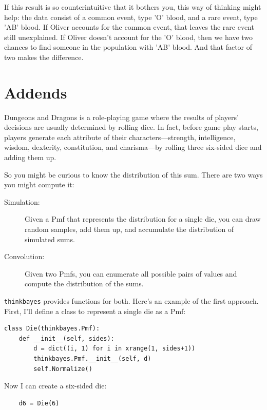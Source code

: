 \documentclass[12pt]{book}
\begin{document}
If this result is so counterintuitive that it bothers you,
this way of thinking might help: the data consist of a common
event, type 'O' blood, and a rare event, type 'AB' blood.
If Oliver accounts for the common event, that leaves the rare
event still unexplained.  If Oliver doesn't account for the
'O' blood, then we have two chances to find someone in the
population with 'AB' blood.  And that factor of two makes
the difference.

\section{Addends}
\label{addends}

Dungeons and Dragons is a role-playing game where the results
of players' decisions are usually determined by rolling dice.
In fact, before game play starts, players generate each
attribute of their characters---strength, intelligence, wisdom,
dexterity, constitution, and charisma---by rolling three
six-sided dice and adding them up.

So you might be curious to know the distribution of this sum.
There are two ways you might compute it:

\begin{description}

\item[Simulation:] Given a Pmf that represents the distribution
for a single die, you can draw random samples, add them up,
and accumulate the distribution of simulated sums.

\item[Convolution:] Given two Pmfs, you can enumerate all possible
pairs of values and compute the distribution of the sums.

\end{description}

\verb"thinkbayes" provides functions for both.  Here's an example
of the first approach.  First, I'll define a class to represent
a single die as a Pmf:

\begin{verbatim}
class Die(thinkbayes.Pmf):
    def __init__(self, sides):
        d = dict((i, 1) for i in xrange(1, sides+1))
        thinkbayes.Pmf.__init__(self, d)
        self.Normalize()
\end{verbatim}

Now I can create a six-sided die:

\begin{verbatim}
    d6 = Die(6)
\end{verbatim}
\end{document}
